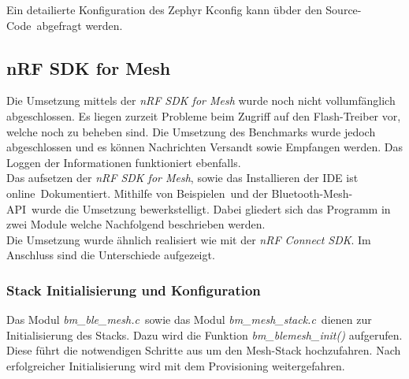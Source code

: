Ein detailierte Konfiguration des Zephyr Kconfig kann übder den Source-Code\footnotemark\ abgefragt werden. 



\subsection{nRF SDK for Mesh}\label{subsec:BluetoothMeshUmsetzungnRFSDKMesh} 

Die Umsetzung mittels der \textit{nRF SDK for Mesh} wurde noch nicht vollumfänglich abgeschlossen. Es liegen zurzeit Probleme beim Zugriff auf den Flash-Treiber vor, welche noch zu beheben sind. Die Umsetzung des Benchmarks wurde jedoch abgeschlossen und es können Nachrichten Versandt sowie Empfangen werden. Das Loggen der Informationen funktioniert ebenfalls. \\

Das aufsetzen der \textit{nRF SDK for Mesh}, sowie das Installieren der IDE ist online\footnotemark\ Dokumentiert. Mithilfe von Beispielen\footnotemark\ und der Bluetooth-Mesh-API\footnotemark\ wurde die Umsetzung bewerkstelligt. Dabei gliedert sich das Programm in zwei Module welche Nachfolgend beschrieben werden.\\

Die Umsetzung wurde ähnlich realisiert wie mit der \textit{nRF Connect SDK}. Im Anschluss sind die Unterschiede aufgezeigt. 






\subsubsection{Stack Initialisierung und Konfiguration}\label{subsubsec:BluetoothMeshUmsetzungnRFSDKInitandConfig} 

Das Modul \textit{bm\_ble\_mesh.c}\footnotemark\ sowie das Modul \textit{bm\_mesh\_stack.c}\footnotemark\ dienen zur Initialisierung des Stacks. Dazu wird die Funktion \textit{bm\_blemesh\_init()} aufgerufen. Diese führt die notwendigen Schritte aus um den Mesh-Stack hochzufahren. Nach erfolgreicher Initialisierung wird mit dem Provisioning weitergefahren. \\


